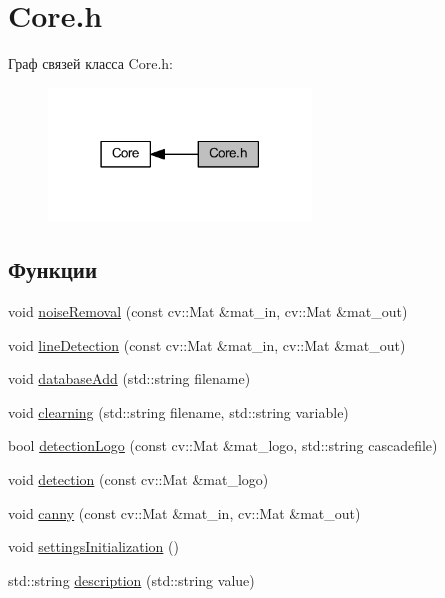 \hypertarget{group__coreh}{}\section{Core.\+h}
\label{group__coreh}
Граф связей класса Core.\+h\+:\nopagebreak
\begin{figure}[H]
\begin{center}
\leavevmode
\includegraphics[width=198pt]{group__coreh}
\end{center}
\end{figure}
\subsection*{Функции}
\begin{DoxyCompactItemize}
\item 
void \mbox{\hyperlink{group__coreh_ga438c92819ed0ad4fc2e187ed5f5a2e27}{noise\+Removal}} (const cv\+::\+Mat \&mat\+\_\+in, cv\+::\+Mat \&mat\+\_\+out)
\item 
void \mbox{\hyperlink{group__coreh_gaa7c37c22318217cd913a50800eb336a3}{line\+Detection}} (const cv\+::\+Mat \&mat\+\_\+in, cv\+::\+Mat \&mat\+\_\+out)
\item 
void \mbox{\hyperlink{group__coreh_ga5a4a30ca6128e13ce1ec6efaa23dd6c7}{database\+Add}} (std\+::string filename)
\item 
void \mbox{\hyperlink{group__coreh_gaebd676a1476aa4d75b280db8ae09d11c}{clearning}} (std\+::string filename, std\+::string variable)
\item 
bool \mbox{\hyperlink{group__coreh_gad1ae53e92ff9edcee7a9f35d2956ae57}{detection\+Logo}} (const cv\+::\+Mat \&mat\+\_\+logo, std\+::string cascadefile)
\item 
void \mbox{\hyperlink{group__coreh_ga0ef39a5ada0921b3abf8906957746b86}{detection}} (const cv\+::\+Mat \&mat\+\_\+logo)
\item 
void \mbox{\hyperlink{group__coreh_gaff2d42310702a0aab15af5ad62a59f2b}{canny}} (const cv\+::\+Mat \&mat\+\_\+in, cv\+::\+Mat \&mat\+\_\+out)
\item 
void \mbox{\hyperlink{group__coreh_ga242d25c7a9a1b7212bb890023c8131f5}{settings\+Initialization}} ()
\item 
std\+::string \mbox{\hyperlink{group__coreh_gaad0390ab7aa8f0cac1eee4492e919baf}{description}} (std\+::string value)
\end{DoxyCompactItemize}


